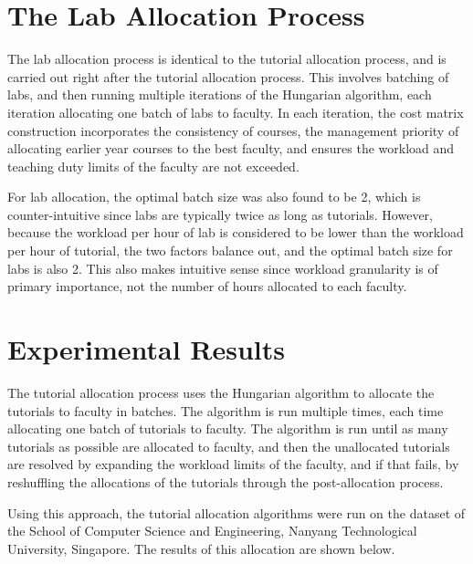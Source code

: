 \section{The Lab Allocation Process}

The lab allocation process is identical to the tutorial allocation process, and is carried out right after the tutorial allocation process. This involves batching of labs, and then running multiple iterations of the Hungarian algorithm, each iteration allocating one batch of labs to faculty. In each iteration, the cost matrix construction incorporates the consistency of courses, the management priority of allocating earlier year courses to the best faculty, and ensures the workload and teaching duty limits of the faculty are not exceeded.

For lab allocation, the optimal batch size was also found to be 2, which is counter-intuitive since labs are typically twice as long as tutorials. However, because the workload per hour of lab is considered to be lower than the workload per hour of tutorial, the two factors balance out, and the optimal batch size for labs is also 2. This also makes intuitive sense since workload granularity is of primary importance, not the number of hours allocated to each faculty.



\section{Experimental Results}

The tutorial allocation process uses the Hungarian algorithm to allocate the tutorials to faculty in batches. The algorithm is run multiple times, each time allocating one batch of tutorials to faculty. The algorithm is run until as many tutorials as possible are allocated to faculty, and then the unallocated tutorials are resolved by expanding the workload limits of the faculty, and if that fails, by reshuffling the allocations of the tutorials through the post-allocation process.

Using this approach, the tutorial allocation algorithms were run on the dataset of the School of Computer Science and Engineering, Nanyang Technological University, Singapore. The results of this allocation are shown below.

